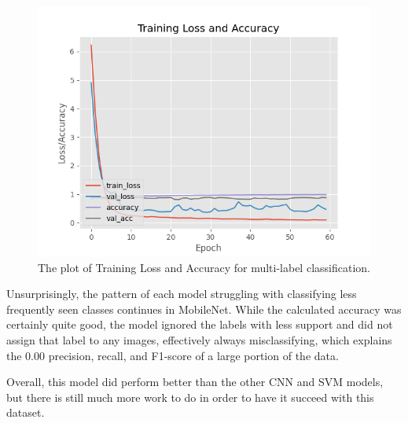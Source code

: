 \documentclass{article}
\theoremstyle{plain}
\theoremstyle{definition}
\theoremstyle{remark}
\begin{document}
\begin{figure}[!h]
    \centering
    \includegraphics[scale=0.5]{final_results}
    \caption{The plot of Training Loss and Accuracy for multi-label classification.}
    \label{fig:trainingloss}
\end{figure}

Unsurprisingly, the pattern of each model struggling with classifying less frequently seen classes
continues in MobileNet. While the calculated accuracy was certainly quite good, the model
ignored the labels with less support and did not assign that label to any images, effectively always
misclassifying, which explains the 0.00 precision, recall, and F1-score of a large portion of the data.

Overall, this model did perform better than the other CNN and SVM models, but there is still much more work to do
in order to have it succeed with this dataset.

\end{document}
